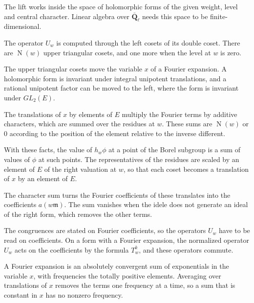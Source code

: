 The lift works inside the space of holomorphic forms of the given weight, level and central character. Linear algebra over $\bar{\mathbf Q}_\ell$ needs this space to be finite-dimensional.

The operator $U_w$ is computed through the left cosets of its double coset. There are $\operatorname N(w)$ upper triangular cosets, and one more when the level at $w$ is zero.

The upper triangular cosets move the variable $x$ of a Fourier expansion. A holomorphic form is invariant under integral unipotent translations, and a rational unipotent factor can be moved to the left, where the form is invariant under $GL_2(E)$.

The translations of $x$ by elements of $E$ multiply the Fourier terms by additive characters, which are summed over the residues at $w$. These sums are $\operatorname N(w)$ or $0$ according to the position of the element relative to the inverse different.

With these facts, the value of $h_w\phi$ at a point of the Borel subgroup is a sum of values of $\phi$ at such points. The representatives of the residues are scaled by an element of $E$ of the right valuation at $w$, so that each coset becomes a translation of $x$ by an element of $E$.

The character sum turns the Fourier coefficients of these translates into the coefficients $a(w\mathfrak m)$. The sum vanishes when the idele does not generate an ideal of the right form, which removes the other terms.

The congruences are stated on Fourier coefficients, so the operators $U_w$ have to be read on coefficients. On a form with a Fourier expansion, the normalized operator $U_w$ acts on the coefficients by the formula $T^k_w$, and these operators commute.

A Fourier expansion is an absolutely convergent sum of exponentials in the variable $x$, with frequencies the totally positive elements. Averaging over translations of $x$ removes the terms one frequency at a time, so a sum that is constant in $x$ has no nonzero frequency.

